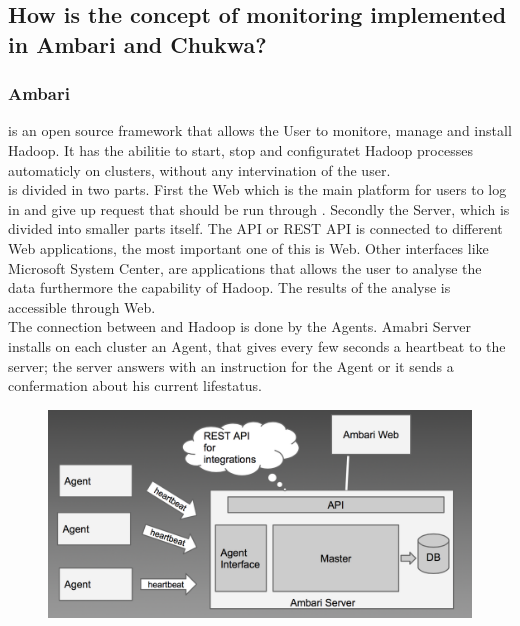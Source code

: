 \subsection{How is the concept of monitoring implemented in Ambari and Chukwa?}
\label{subsec:Implementation}

\subsubsection{Ambari}
\amb is an open source framework that allows the User to monitore, manage and install Hadoop. It has the abilitie to start, stop and configuratet Hadoop processes automaticly on clusters, without any intervination of the user.\cite{Sako2013}
\\
\amb is divided in two parts. First the \amb Web which is the main platform for users to log in and give up request that should be run through \amb. Secondly the \amb Server, which is divided into smaller parts itself. The API or REST API is connected to different Web applications, the most important one of this is \amb Web. Other interfaces like Microsoft System Center, are applications that allows the user to analyse the data furthermore the capability of Hadoop. The results of the analyse is accessible through \amb Web.
\\
The connection between \amb and Hadoop is done by the \amb Agents. Amabri Server installs on each cluster an \amb Agent, that gives every few seconds a heartbeat to the server; the server answers with an instruction for the Agent or it sends a confermation about his current lifestatus. 
\\
\begin{figure}
\centering
\includegraphics[width=0.7\linewidth]{images/Bild}
\caption{}
\label{fig:Bild}
\end{figure}

